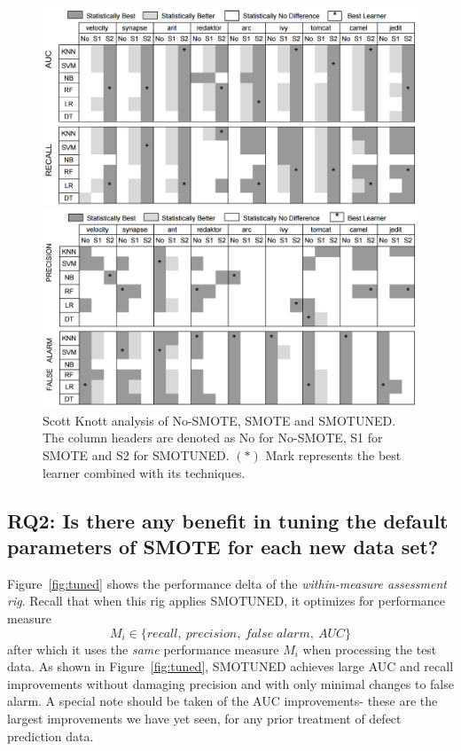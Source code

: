 \documentclass[10pt,conference]{IEEEtran}
\theoremstyle{break}
\theoremstyle{break}
\newcommand{\smb}{{\sc SMOTUNED}}
\begin{document}
\begin{figure}[!t]
\begin{minipage}{.5\linewidth}
\centering
        \includegraphics[width=1\linewidth]{./fig/AUC_recall.png}
            \end{minipage}%
\begin{minipage}{.5\linewidth}
        \centering
        \includegraphics[width=1\linewidth]{./fig/prec_pf.png}
    \end{minipage}%
    \caption{Scott Knott analysis of No-SMOTE, SMOTE and SMOTUNED. The column headers are denoted as No for No-SMOTE, S1 for SMOTE and S2 for SMOTUNED. $(\ast)$ Mark represents the best learner combined with its techniques.}
    \label{fig:stats}
\vspace{-0.2cm}
\end{figure}


\subsection {{\bf RQ2}: Is there any benefit in tuning the default parameters of SMOTE for each new data set?}

Figure~\ref{fig:tuned} shows the performance delta of the {\em within-measure assessment rig}.
Recall that when this rig applies {\smb}, it optimizes for performance measure
\[M_i \in \{ 
\mathit{recall},
\ \mathit{precision}, 
\ \mathit{false\; alarm},
\ \mathit{AUC}
\}
\]
after which it uses the {\em same} performance measure
$M_i$ when processing the test data.
As shown in Figure~\ref{fig:tuned}, 
{\smb} achieves large AUC and recall improvements
without
 damaging precision and  with only minimal changes
 to false alarm. A special note should be taken of the AUC improvements- these are the largest improvements
 we have yet seen, for any prior treatment of defect prediction data.
\end{document}
